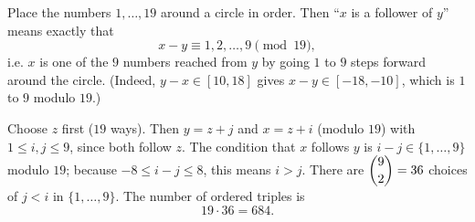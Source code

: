 Place the numbers $1,\dots,19$ around a circle in order. Then ``$x$ is a follower of $y$'' means exactly that
\[
x-y\equiv1,2,\dots,9\pmod{19},
\]
i.e. $x$ is one of the $9$ numbers reached from $y$ by going $1$ to $9$ steps forward around the circle. (Indeed, $y-x\in[10,18]$ gives $x-y\in[-18,-10]$, which is $1$ to $9$ modulo $19$.)

Choose $z$ first ($19$ ways). Then $y=z+j$ and $x=z+i$ (modulo $19$) with $1\le i,j\le9$, since both follow $z$. The condition that $x$ follows $y$ is $i-j\in\{1,\dots,9\}$ modulo $19$; because $-8\le i-j\le8$, this means $i>j$. There are $\dbinom92=36$ choices of $j<i$ in $\{1,\dots,9\}$. The number of ordered triples is
\[
19\cdot36=\boxed{684}.
\]
